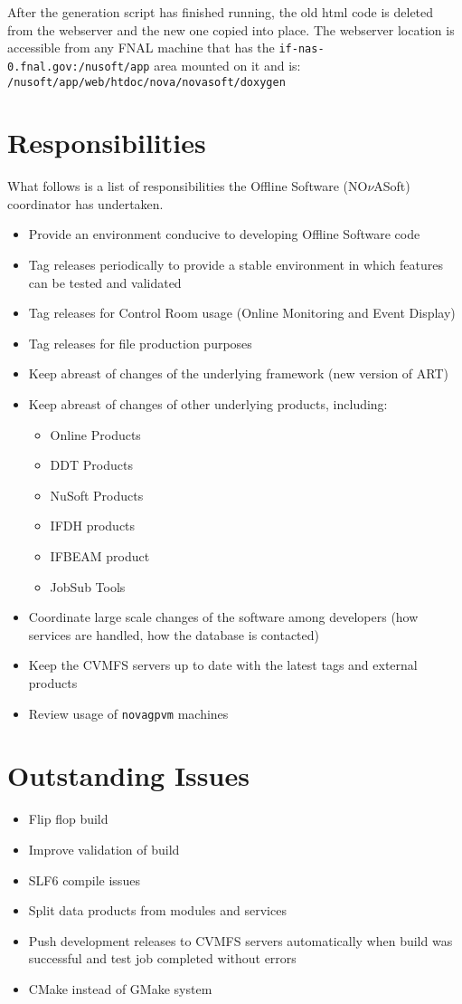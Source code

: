 \documentclass[letterpaper,10pt]{article}
\newcommand{\nova}{NO$\nu$A}
\begin{document}
After the generation script has finished running, the old html code is deleted from the webserver and the new one copied into place. The webserver location is accessible from any FNAL machine that has the \verb|if-nas-0.fnal.gov:/nusoft/app| area mounted on it and is:\\ \verb|/nusoft/app/web/htdoc/nova/novasoft/doxygen|


\section{Responsibilities}
What follows is a list of responsibilities the Offline Software (\nova Soft) coordinator has undertaken.
\begin{itemize}
\item Provide an environment conducive to developing Offline Software code
\item Tag releases periodically to provide a stable environment in which features can be tested and validated
\item Tag releases for Control Room usage (Online Monitoring and Event Display)
\item Tag releases for file production purposes
\item Keep abreast of changes of the underlying framework (new version of ART)
\item Keep abreast of changes of other underlying products, including:
  \begin{itemize}
  \item Online Products
  \item DDT Products
  \item NuSoft Products
  \item IFDH products
  \item IFBEAM product
  \item JobSub Tools   
  \end{itemize}
\item Coordinate large scale changes of the software among developers (how services are handled, how the database is contacted)
\item Keep the CVMFS servers up to date with the latest tags and external products
\item Review usage of \verb|novagpvm| machines
\end{itemize}


\section{Outstanding Issues}
\begin{itemize}
\item Flip flop build
\item Improve validation of build
\item SLF6 compile issues
\item Split data products from modules and services
\item Push development releases to CVMFS servers automatically when build was successful and test job completed without errors
\item CMake instead of GMake system
\end{itemize}
\end{document}
